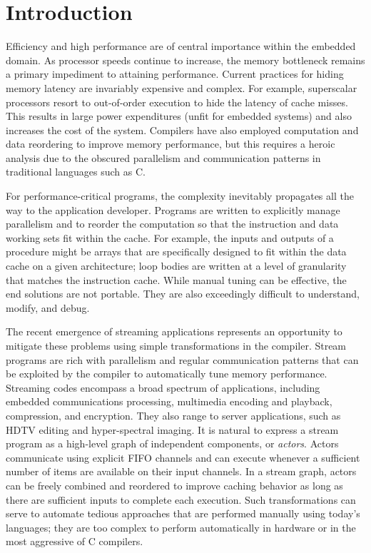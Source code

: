 \section{Introduction}

Efficiency and high performance are of central importance within the
embedded domain.  As processor speeds continue to increase, the memory
bottleneck remains a primary impediment to attaining performance.
Current practices for hiding memory latency are invariably expensive
and complex.  For example, superscalar processors resort to
out-of-order execution to hide the latency of cache misses.  This
results in large power expenditures (unfit for embedded systems) and
also increases the cost of the system.  Compilers have also employed
computation and data reordering to improve memory performance, but this requires
a heroic analysis due to the obscured parallelism and communication
patterns in traditional languages such as C.

For performance-critical programs, the complexity inevitably
propagates all the way to the application developer.  Programs are
written to explicitly manage parallelism and to reorder the
computation so that the instruction and data working sets fit within
the cache.  For example, the inputs and outputs of a procedure might
be arrays that are specifically designed to fit within the data cache
on a given architecture; loop bodies are written at a level of
granularity that matches the instruction cache.  While manual tuning
can be effective, the end solutions are not portable.  They are also
exceedingly difficult to understand, modify, and debug.

The recent emergence of streaming applications represents an
opportunity to mitigate these problems using simple transformations in
the compiler.  Stream programs are rich with parallelism and regular
communication patterns that can be exploited by the compiler to
automatically tune memory performance.  Streaming codes encompass a
broad spectrum of applications, including embedded communications
processing, multimedia encoding and playback, compression, and
encryption.  They also range to server applications, such as HDTV
editing and hyper-spectral imaging.  It is natural to express a stream
program as a high-level graph of independent components, or {\it
actors}.  Actors communicate using explicit FIFO channels and can
execute whenever a sufficient number of items are available on their
input channels.  In a stream graph, actors can be freely combined and
reordered to improve caching behavior as long as there are sufficient
inputs to complete each execution.  Such transformations can serve to
automate tedious approaches that are performed manually using today's
languages; they are too complex to perform automatically in hardware
or in the most aggressive of C compilers.

